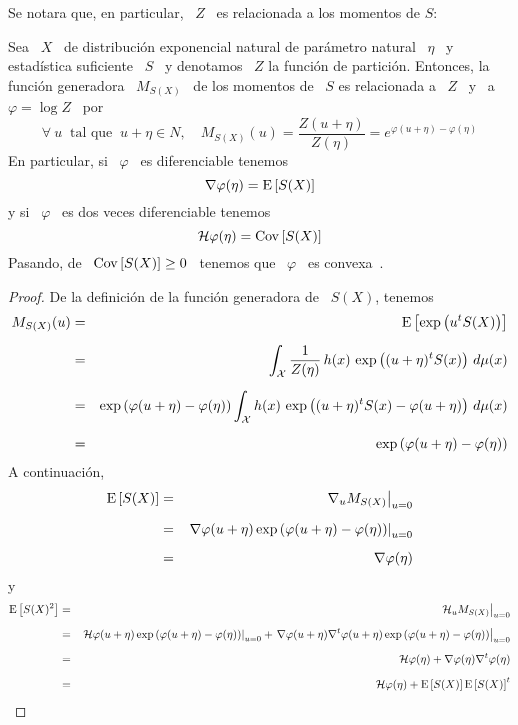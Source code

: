 Se notara que, en particular, \ $Z$ \ es relacionada a los momentos de $S$:
%
\begin{teorema}
%
  Sea \  $X$ \  de distribuci\'on exponencial  natural de par\'ametro  natural \
  $\eta$ \ y estad\'istica suficiente \ $S$  \ y denotamos \ $Z$ la funci\'on de
  partici\'on. Entonces, la funci\'on generadora  \ $M_{S(X)}$ \ de los momentos
  de \ $S$ es relacionada a \ $Z$ \ y \ a \ $\varphi = \log Z$ \ por
  \[
  \forall \: u \: \mbox{ tal que } \: u+\eta \in N, \quad M_{S(X)}(u) = \frac{Z(u+\eta)}{Z(\eta)} =
  e^{\varphi(u+\eta) - \varphi(\eta)}
  \]
  En particular, si \  $\varphi$ \ es diferenciable tenemos
  \[
  \nabla \varphi (\eta) = \operatorname{E}\left[ S(X) \right]
  \]
  y si \ $\varphi$ \ es dos veces diferenciable tenemos
  \[
  \mathcal{H} \varphi (\eta) = \operatorname{Cov}\left[ S(X) \right]
  \]
  Pasando,  de \  $\operatorname{Cov}\left[ S(X)  \right] \ge  0$ \ tenemos  que \  $\varphi$  \ es
  convexa~\cite{CamMar09}.
%
\end{teorema}
%
\begin{proof}
  De la definici\'on de la funci\'on generadora de \ $S(X)$, tenemos
  \begin{eqnarray*}
  M_{S(X)}(u) & = &\operatorname{E}\left[ \exp\left( u^t S(X) \right) \right]\\[2mm]
  & = & \int_{\mathcal{X}} \frac{1}{Z(\eta)} \, h(x) \, \exp\left( (u + \eta)^t S(x) \right) \,
  d\mu(x)\\[2mm]
  & = & \exp\left( \varphi(u+\eta) - \varphi(\eta) \right) \int_{\mathcal{X}} h(x) \,
  \exp\left( (u + \eta)^t S(x) - \varphi(u+\eta) \right) \, d\mu(x)\\[2mm]
  & = & \exp\left( \varphi(u+\eta) - \varphi(\eta) \right)
  \end{eqnarray*}
  A continuaci\'on,
  \begin{eqnarray*}
  \operatorname{E}\left[ S(X) \right] & = & \left. \nabla_u M_{S(X)} \right|_{u=0}\\[2mm]
  & = & \left. \nabla \varphi(u+\eta) \exp\left( \varphi(u+\eta) - \varphi(\eta) \right) \right|_{u=0}\\[2mm]
  & = & \nabla \varphi(\eta)
  \end{eqnarray*}
  y
  \begin{eqnarray*}
  \operatorname{E}\left[ S(X)^2 \right] & = & \left. \mathcal{H}_u M_{S(X)} \right|_{u=0}\\[2mm]
  & = & \left. \mathcal{H} \varphi(u+\eta) \exp\left( \varphi(u+\eta) - \varphi(\eta)
  \right) \right|_{u=0} + \left. \nabla \varphi(u+\eta) \nabla^t \varphi(u+\eta)
  \exp\left( \varphi(u+\eta) - \varphi(\eta) \right) \right|_{u=0}\\[2mm]
  & = & \mathcal{H} \varphi(\eta) + \nabla \varphi(\eta) \nabla^t \varphi(\eta)\\[2mm]
  & = & \mathcal{H} \varphi(\eta) + \operatorname{E}\left[ S(X) \right] \operatorname{E}\left[ S(X) \right]^t
  \end{eqnarray*}
\end{proof}



